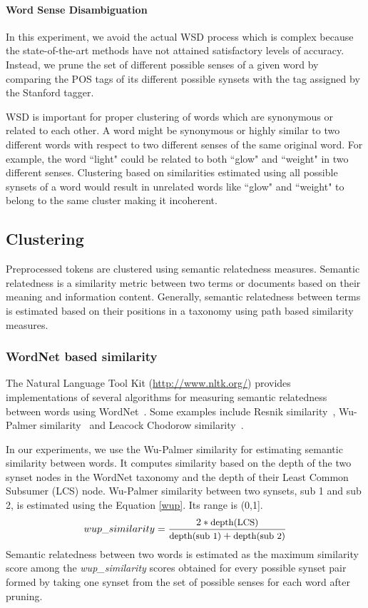 \documentclass[11pt]{article}
\begin{document}
\paragraph{Word Sense Disambiguation} In this experiment, we avoid the actual WSD process which is complex because the state-of-the-art methods have not attained satisfactory levels of accuracy. Instead, we prune the set of different possible senses of a given word by comparing the POS tags of its different possible synsets with the tag assigned by the Stanford tagger. 

WSD is important for proper clustering of words which are synonymous or related to each other. A word might be synonymous or highly similar to two different words with respect to two different senses of the same original word. For example, the word ``light" could be related to both ``glow" and ``weight" in two different senses. Clustering based on similarities estimated using all possible synsets of a word would result in unrelated words like ``glow" and ``weight" to belong to the same cluster making it incoherent.

\subsection{Clustering}
Preprocessed tokens are clustered using semantic relatedness measures. Semantic relatedness is a similarity metric
between two terms or documents based on their meaning and information content. Generally, semantic relatedness between terms is estimated based on their
positions in a taxonomy using path based similarity measures.

\subsubsection*{WordNet based similarity}
The Natural Language Tool Kit (\url{http://www.nltk.org/})  provides implementations of several algorithms for measuring semantic relatedness between words using WordNet~\cite{mih:06}. Some examples include Resnik similarity~\cite{res:95}, Wu-Palmer similarity~\cite{wu:94} and Leacock Chodorow similarity~\cite{lea:98}.

In our experiments, we use the Wu-Palmer similarity for estimating semantic similarity between words. It computes similarity based on the depth of the two synset nodes in the WordNet taxonomy and the depth of their Least Common Subsumer (LCS) node. Wu-Palmer similarity between two synsets, sub 1 and sub 2, is estimated using the Equation  \ref{wup}. Its range is (0,1].
\begin{equation}   \label{wup}\small
{wup\_similarity} = \frac{ 2* \text{depth(LCS)}}{\text{depth(sub 1)} + \text{depth(sub 2)}}
\end{equation}  
Semantic relatedness between two words is estimated as the maximum similarity score among the {\em  wup\_similarity} scores obtained for every possible synset pair formed by taking one synset from the set of possible senses for each word after pruning.
\end{document}
